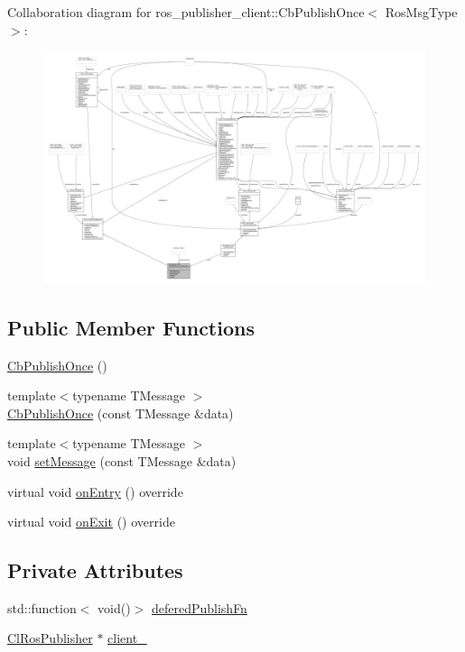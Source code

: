 Collaboration diagram for ros\+\_\+publisher\+\_\+client\+:\+:Cb\+Publish\+Once$<$ Ros\+Msg\+Type $>$\+:\nopagebreak
\begin{figure}[H]
\begin{center}
\leavevmode
\includegraphics[width=350pt]{classros__publisher__client_1_1CbPublishOnce__coll__graph}
\end{center}
\end{figure}
\subsection*{Public Member Functions}
\begin{DoxyCompactItemize}
\item 
\hyperlink{classros__publisher__client_1_1CbPublishOnce_a7e58cbae17032aef05161697b7a061c5}{Cb\+Publish\+Once} ()
\item 
{\footnotesize template$<$typename T\+Message $>$ }\\\hyperlink{classros__publisher__client_1_1CbPublishOnce_a354897ea9a30ab5d95acc8837bf9ef0f}{Cb\+Publish\+Once} (const T\+Message \&data)
\item 
{\footnotesize template$<$typename T\+Message $>$ }\\void \hyperlink{classros__publisher__client_1_1CbPublishOnce_a06bef500e116390ee85a790401e600d8}{set\+Message} (const T\+Message \&data)
\item 
virtual void \hyperlink{classros__publisher__client_1_1CbPublishOnce_a223cb50cd7e4041d42106eb600575bae}{on\+Entry} () override
\item 
virtual void \hyperlink{classros__publisher__client_1_1CbPublishOnce_a879c967bb3e5e894e61256629636fcbd}{on\+Exit} () override
\end{DoxyCompactItemize}
\subsection*{Private Attributes}
\begin{DoxyCompactItemize}
\item 
std\+::function$<$ void()$>$ \hyperlink{classros__publisher__client_1_1CbPublishOnce_a91e0e3d574d25e160bcb3a4ca81bb0b2}{defered\+Publish\+Fn}
\item 
\hyperlink{classros__publisher__client_1_1ClRosPublisher}{Cl\+Ros\+Publisher} $\ast$ \hyperlink{classros__publisher__client_1_1CbPublishOnce_a50a1b2a4892ad780406231e0f870746a}{client\+\_\+}
\end{DoxyCompactItemize}
